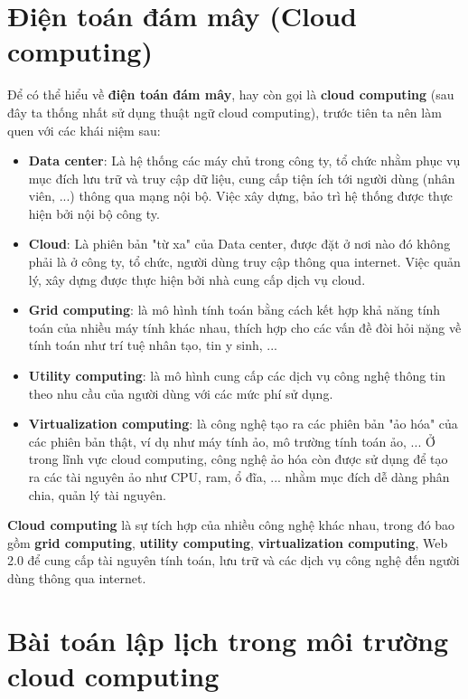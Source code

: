 \documentclass{my_style}
\begin{document}
\section{Điện toán đám mây (Cloud computing)}
Để có thể hiểu về \textbf{điện toán đám mây}, hay còn gọi là \textbf{cloud computing} (sau đây ta thống nhất sử dụng thuật ngữ cloud computing), trước tiên ta nên làm quen với các khái niệm sau: 
\begin{itemize}
	\item \textbf{Data center}:  Là hệ thống các máy chủ trong công ty, tổ chức nhằm phục vụ mục đích lưu trữ và truy cập dữ liệu, cung cấp tiện ích tới người dùng (nhân viên, ...) thông qua mạng nội bộ. Việc xây dựng, bảo trì hệ thống được thực hiện bởi nội bộ công ty.
	\item \textbf{Cloud}: Là phiên bản "từ xa" của Data center, được đặt ở nơi nào đó không phải là ở công ty, tổ chức, người dùng truy cập thông qua internet. Việc quản lý, xây dựng được thực hiện bởi nhà cung cấp dịch vụ cloud.
	\item \textbf{Grid computing}\cite{2}: là mô hình tính toán bằng cách kết hợp khả năng tính toán của nhiều máy tính khác nhau, thích hợp cho các vấn đề đòi hỏi nặng về tính toán như trí tuệ nhân tạo, tin y sinh, ...
	\item \textbf{Utility computing}\cite{1}\cite{3}: là mô hình cung cấp các dịch vụ công nghệ thông tin theo nhu cầu của người dùng với các mức phí sử dụng. 
	\item \textbf{Virtualization computing}\cite{4}: là công nghệ tạo ra các phiên bản "ảo hóa" của các phiên bản thật, ví dụ như máy tính ảo, mô trường tính toán ảo, ... Ở trong lĩnh vực cloud computing, công nghệ ảo hóa còn được sử dụng để tạo ra các tài nguyên ảo như CPU, ram, ổ đĩa, ... nhằm mục đích dễ dàng phân chia, quản lý tài nguyên.
\end{itemize}
\textbf{Cloud computing}\cite{1} là sự tích hợp của nhiều công nghệ khác nhau, trong đó bao gồm \textbf{grid computing}, \textbf{utility computing}, \textbf{virtualization computing}, Web 2.0 để cung cấp tài nguyên tính toán, lưu trữ và các dịch vụ công nghệ đến người dùng thông qua internet. \\ 


\section{Bài toán lập lịch trong môi trường cloud computing}
\end{document}
